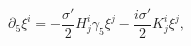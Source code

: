 \begin{equation}
  \partial_5 \xi^i 
    = -\frac{\sigma'}{2} H^i_j \gamma_5\xi^j
      -\frac{i\sigma'}{2} K^i_j \xi^j,
\label{eq:killingspinoransatz1}
\end{equation}

